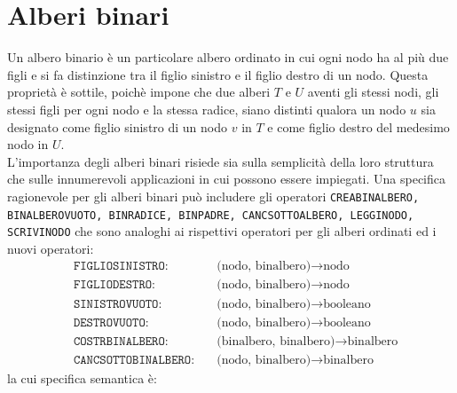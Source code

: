 \documentclass[12pt]{report}
\begin{document}
  	\section{Alberi binari}
  	Un albero binario è un particolare albero ordinato in cui ogni nodo ha al più due figli e si fa distinzione tra il figlio sinistro e il figlio destro di un nodo. Questa proprietà è sottile, poichè impone che due alberi $T$ e $U$ aventi gli stessi nodi, gli stessi figli per ogni nodo e la stessa radice, siano distinti qualora un nodo $u$ sia designato come figlio sinistro di un nodo $v$ in $T$ e come figlio destro del medesimo nodo in $U$.\\
  	L'importanza degli alberi binari risiede sia sulla semplicità della loro struttura che sulle innumerevoli applicazioni in cui possono essere impiegati. Una specifica ragionevole per gli alberi binari può includere gli operatori \texttt{CREABINALBERO, BINALBEROVUOTO, BINRADICE, BINPADRE, CANCSOTTOALBERO, LEGGINODO, SCRIVINODO} che sono analoghi ai rispettivi operatori per gli alberi ordinati ed i nuovi operatori:
  	\begin{align*}
  		&\texttt{FIGLIOSINISTRO}: &\quad \text{(nodo, binalbero)} \to \text{nodo} \\
  		&\texttt{FIGLIODESTRO:} &\quad \text{(nodo, binalbero)}  \to \text{nodo}  \\
  		&\texttt{SINISTROVUOTO:} &\quad \text{(nodo, binalbero)}  \to \text{booleano}  \\
  		&\texttt{DESTROVUOTO:} &\quad \text{(nodo, binalbero)}  \to \text{booleano}   \\
  		&\texttt{COSTRBINALBERO:} &\quad \text{(binalbero, binalbero)}  \to \text{binalbero} \\
  		&\texttt{CANCSOTTOBINALBERO:} &\quad \text{(nodo, binalbero)} \to \text{binalbero}
  	\end{align*}
  	la cui specifica semantica è:
\end{document}
